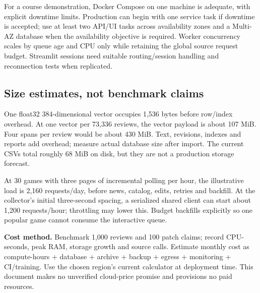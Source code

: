 \documentclass[10pt,letterpaper]{article}
\newcommand{\key}[1]{\textbf{\color{ink}#1}}
\begin{document}
For a course demonstration, Docker Compose on one machine is adequate, with explicit downtime limits. Production can begin with one service task if downtime is accepted; use at least two API/UI tasks across availability zones and a Multi-AZ database when the availability objective is required. Worker concurrency scales by queue age and CPU only while retaining the global source request budget. Streamlit sessions need suitable routing/session handling and reconnection tests when replicated.

\subsection{Size estimates, not benchmark claims}
One float32 384-dimensional vector occupies 1,536 bytes before row/index overhead. At one vector per 73,336 reviews, the vector payload is about 107 MiB. Four spans per review would be about 430 MiB. Text, revisions, indexes and reports add overhead; measure actual database size after import. The current CSVs total roughly 68 MiB on disk, but they are not a production storage forecast.

At 30 games with three pages of incremental polling per hour, the illustrative load is 2,160 requests/day, before news, catalog, edits, retries and backfill. At the collector's initial three-second spacing, a serialized shared client can start about 1,200 requests/hour; throttling may lower this. Budget backfills explicitly so one popular game cannot consume the interactive queue.

\key{Cost method.} Benchmark 1,000 reviews and 100 patch claims; record CPU-seconds, peak RAM, storage growth and source calls. Estimate monthly cost as compute-hours + database + archive + backup + egress + monitoring + CI/training. Use the chosen region's current calculator at deployment time. This document makes no unverified cloud-price promise and provisions no paid resources.
\end{document}
